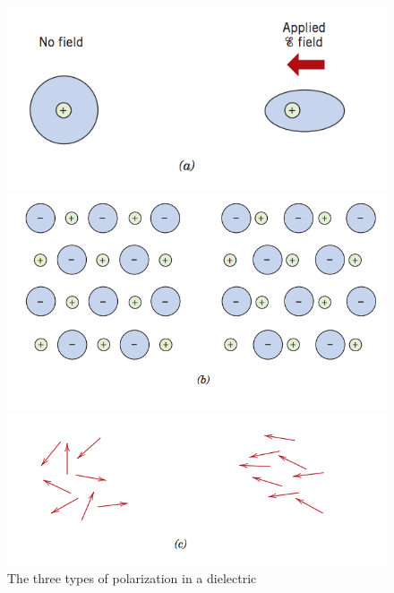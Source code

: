 \documentclass{article}
\begin{document}
\begin{figure}[h!]
	\begin{minipage}{.33\textwidth}
		\centering
		\includegraphics[width=\linewidth]{electric.png}
	\end{minipage}
	\begin{minipage}{.33\textwidth}
		\centering
		\includegraphics[width=\linewidth]{ionic.png}
	\end{minipage}
	\begin{minipage}{.33\textwidth}
		\centering
		\includegraphics[width=\linewidth]{dipole.png}
	\end{minipage}
	\caption{The three types of polarization in a dielectric}
\end{figure}
\end{document}
